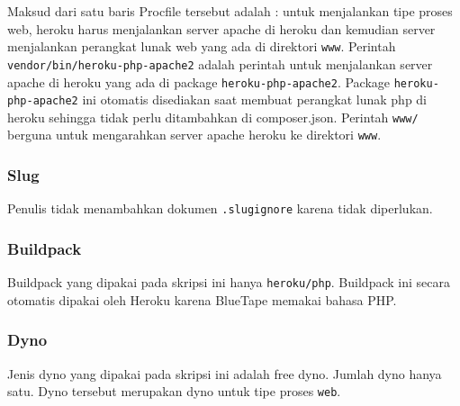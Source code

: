 Maksud dari satu baris Procfile tersebut adalah : untuk menjalankan tipe proses web, heroku harus menjalankan server apache di heroku dan kemudian server menjalankan perangkat lunak web yang ada di direktori \texttt{www}. Perintah \texttt{vendor/bin/heroku-php-apache2} adalah perintah untuk menjalankan server apache di heroku yang ada di package \texttt{heroku-php-apache2}. Package \texttt{heroku-php-apache2} ini otomatis disediakan saat membuat perangkat lunak php di heroku sehingga tidak perlu ditambahkan di composer.json. Perintah \texttt{www/} berguna untuk mengarahkan server apache heroku ke direktori \texttt{www}.

\subsubsection{Slug}
Penulis tidak menambahkan dokumen \texttt{.slugignore} karena tidak diperlukan.

\subsubsection{Buildpack}
Buildpack yang dipakai pada skripsi ini hanya \texttt{heroku/php}. Buildpack ini secara otomatis dipakai oleh Heroku karena BlueTape memakai bahasa PHP.

\subsubsection{Dyno}
Jenis dyno yang dipakai pada skripsi ini adalah free dyno. Jumlah dyno hanya satu. Dyno tersebut merupakan dyno untuk tipe proses \texttt{web}.

